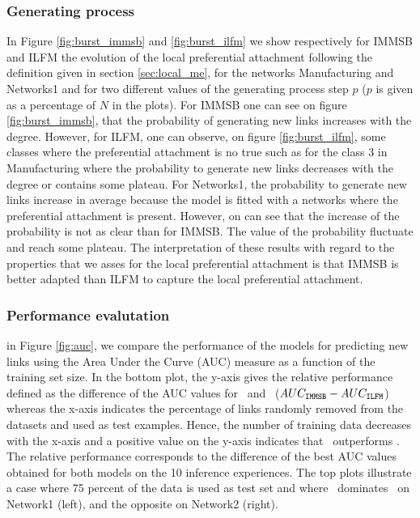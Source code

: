 


\subsubsection{Generating process}
In Figure \ref{fig:burst_immsb} and \ref{fig:burst_ilfm} we show respectively for IMMSB and ILFM the evolution of the local preferential attachment following the definition given in section \ref{sec:local_me}, for the networks Manufacturing and Networks1 and for two different values of the generating process step $p$ ($p$ is given as a percentage of $N$ in the plots). For IMMSB one can see on figure \ref{fig:burst_immsb}, that the probability of generating new links increases with the degree. However, for ILFM, one can observe, on figure \ref{fig:burst_ilfm}, some classes where the preferential attachment is no true such as for the class 3 in Manufacturing where the probability to generate new links decreases with the degree or contains some plateau. For Networks1, the probability to generate new links increase in average because the model is fitted with a networks where the preferential attachment is present. However, on can see that the increase of the probability is not as clear than for IMMSB. The value of the probability fluctuate and reach some plateau. The interpretation of these results with regard to the properties that we asses for the local preferential attachment is that IMMSB is better adapted than ILFM to capture the local preferential attachment.


\begin{figure}[h]
\centering

\end{figure}

\begin{figure}[h]
\centering

\end{figure}

\subsubsection{Performance evalutation}


in Figure \ref{fig:auc}, we compare the performance of the models for predicting new links using the Area Under the Curve (AUC) measure as a function of the training set size. In the bottom plot, the y-axis gives the relative performance defined as the difference of the AUC values for \imb\ and \ifm\ ($AUC_{\texttt{IMMSB}} - AUC_{\texttt{ILFM}}$) whereas the x-axis indicates the percentage of links randomly removed from the datasets and used as test examples. Hence, the number of training data decreases with the x-axis and a positive value on the y-axis indicates that \imb\ outperforms \ifm.  The relative performance corresponds to the difference of the best AUC values obtained for both models on the 10 inference experiences. The top plots illustrate a case where 75 percent of the data is used as test set and where \imb\ dominates \ifm\ on Network1 (left), and the opposite on Network2 (right).


